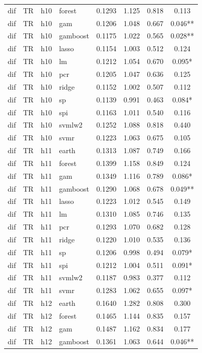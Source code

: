 \begin{ThreePartTable}
\begin{longtable}[t]{llclcccc}
dif & TR & h10 & forest & 0.1293 & 1.125 & 0.818 & 0.113\\
dif & TR & h10 & gam & 0.1206 & 1.048 & 0.667 & 0.046**\\
dif & TR & h10 & gamboost & 0.1175 & 1.022 & 0.565 & 0.028**\\
dif & TR & h10 & lasso & 0.1154 & 1.003 & 0.512 & 0.124\\
dif & TR & h10 & lm & 0.1212 & 1.054 & 0.670 & 0.095*\\
dif & TR & h10 & pcr & 0.1205 & 1.047 & 0.636 & 0.125\\
dif & TR & h10 & ridge & 0.1152 & 1.002 & 0.507 & 0.112\\
dif & TR & h10 & sp & 0.1139 & 0.991 & 0.463 & 0.084*\\
dif & TR & h10 & spi & 0.1163 & 1.011 & 0.540 & 0.116\\
dif & TR & h10 & svmlw2 & 0.1252 & 1.088 & 0.818 & 0.440\\
dif & TR & h10 & svmr & 0.1223 & 1.063 & 0.675 & 0.105\\
\addlinespace
dif & TR & h11 & earth & 0.1313 & 1.087 & 0.749 & 0.166\\
dif & TR & h11 & forest & 0.1399 & 1.158 & 0.849 & 0.124\\
dif & TR & h11 & gam & 0.1349 & 1.116 & 0.789 & 0.086*\\
dif & TR & h11 & gamboost & 0.1290 & 1.068 & 0.678 & 0.049**\\
dif & TR & h11 & lasso & 0.1223 & 1.012 & 0.545 & 0.149\\
dif & TR & h11 & lm & 0.1310 & 1.085 & 0.746 & 0.135\\
dif & TR & h11 & pcr & 0.1293 & 1.070 & 0.682 & 0.128\\
dif & TR & h11 & ridge & 0.1220 & 1.010 & 0.535 & 0.136\\
dif & TR & h11 & sp & 0.1206 & 0.998 & 0.494 & 0.079*\\
dif & TR & h11 & spi & 0.1212 & 1.004 & 0.511 & 0.091*\\
dif & TR & h11 & svmlw2 & 0.1187 & 0.983 & 0.377 & 0.112\\
dif & TR & h11 & svmr & 0.1283 & 1.062 & 0.655 & 0.097*\\
\addlinespace
dif & TR & h12 & earth & 0.1640 & 1.282 & 0.808 & 0.300\\
dif & TR & h12 & forest & 0.1465 & 1.144 & 0.835 & 0.157\\
dif & TR & h12 & gam & 0.1487 & 1.162 & 0.834 & 0.177\\
dif & TR & h12 & gamboost & 0.1361 & 1.063 & 0.644 & 0.046**\\

\end{longtable}
\end{ThreePartTable}
